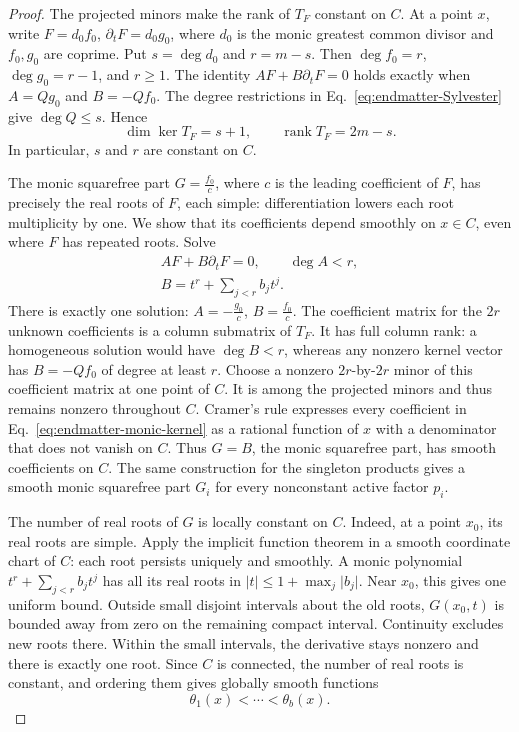 \documentclass[aps,prl,reprint,notitlepage,nofootinbib,nobibnotes]{revtex4-2}
\begin{document}
\begin{proof}
The projected minors make the rank of \(T_F\) constant on \(C\).
At a point \(x\), write
\(F=d_0 f_0\), \(\partial_tF=d_0 g_0\), where \(d_0\) is the monic greatest
common divisor and \(f_0,g_0\) are coprime. Put \(s=\deg d_0\) and
\(r=m-s\). Then \(\deg f_0=r\), \(\deg g_0=r-1\), and \(r\ge1\).
The identity \(AF+B\partial_tF=0\) holds exactly when
\(A=Qg_0\) and \(B=-Qf_0\). The degree restrictions in
Eq.~\eqref{eq:endmatter-Sylvester} give \(\deg Q\le s\). Hence
\[
 \dim\ker T_F=s+1,\qquad \operatorname{rank}T_F=2m-s.
\]
In particular, \(s\) and \(r\) are constant on \(C\).

The monic squarefree part \(G=\frac{f_0}{c}\), where \(c\) is the leading
coefficient of \(F\), has precisely the real roots of \(F\), each
simple: differentiation lowers each root multiplicity by one.
We show that its coefficients depend smoothly on \(x\in C\), even
where \(F\) has repeated roots. Solve
\begin{equation}\label{eq:endmatter-monic-kernel}
 \begin{gathered}
 AF+B\partial_tF=0,\qquad\deg A<r,\\
 B=t^r+\sum_{j<r}b_jt^j.
 \end{gathered}
\end{equation}
There is exactly one solution: \(A=-\frac{g_0}{c}\), \(B=\frac{f_0}{c}\). The coefficient
matrix for the \(2r\) unknown coefficients is a column submatrix of
\(T_F\). It has full column rank: a homogeneous
solution would have \(\deg B<r\), whereas any nonzero kernel vector
has \(B=-Qf_0\) of degree at least \(r\).
Choose a nonzero \(2r\)-by-\(2r\) minor of this coefficient matrix
at one point of \(C\). It is among
the projected minors and thus remains nonzero throughout \(C\).
Cramer's rule expresses every coefficient in Eq.~\eqref{eq:endmatter-monic-kernel}
as a rational function of \(x\) with a denominator that does not vanish
on \(C\). Thus \(G=B\), the monic squarefree part, has smooth
coefficients on \(C\). The same construction for the singleton
products gives a smooth monic squarefree part \(G_i\) for every
nonconstant active factor \(p_i\).

The number of real roots of \(G\) is locally constant on \(C\).
Indeed, at a point \(x_0\), its real roots are simple. Apply the
implicit function theorem in a smooth coordinate chart of \(C\):
each root persists uniquely and smoothly. A monic
polynomial \(t^r+\sum_{j<r}b_jt^j\) has all its real roots in
\(\lvert t\rvert\le1+\max_j\lvert b_j\rvert\). Near \(x_0\), this
gives one uniform bound. Outside small disjoint intervals about the old
roots, \(G(x_0,t)\) is bounded away from zero on the remaining compact
interval. Continuity excludes new roots there. Within the small
intervals, the derivative stays nonzero and there is exactly one root.
Since \(C\) is connected, the number of real roots is constant, and
ordering them gives globally smooth functions
\[
 \theta_1(x)<\cdots<\theta_b(x).
\]


\end{proof}
\end{document}
